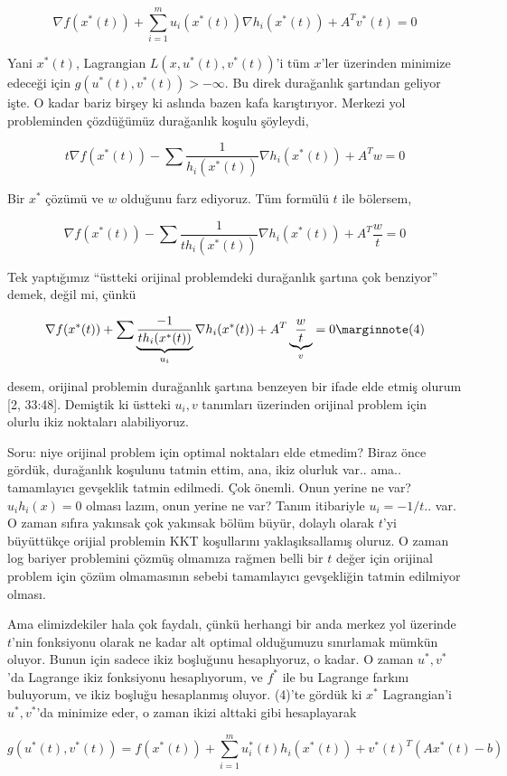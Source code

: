 \documentclass[12pt,fleqn]{article}\usepackage{../../common}
\begin{document}
$$
\nabla f(x^*(t)) + \sum _{i=1}^{m} u_i (x^*(t)) \nabla h_i(x^*(t)) + 
A^T v^*(t) = 0
$$


Yani $x^*(t)$, Lagrangian $L(x,u^*(t),v^*(t))$'i tüm $x$'ler üzerinden
minimize edeceği için $g(u^*(t),v^*(t)) > -\infty$. Bu direk durağanlık
şartından geliyor işte. O kadar bariz birşey ki aslında bazen kafa
karıştırıyor. Merkezi yol probleminden çözdüğümüz durağanlık koşulu
şöyleydi,

$$
t \nabla f(x^*(t)) - \sum \frac{1}{h_i(x^*(t))} \nabla h_i(x^*(t)) + A^T w= 0
$$

Bir $x^*$ çözümü ve $w$ olduğunu farz ediyoruz. Tüm formülü $t$ ile
bölersem,

$$
\nabla f(x^*(t)) - \sum \frac{1}{t h_i(x^*(t))} \nabla h_i(x^*(t)) + A^T \frac{w}{t}= 0
$$

Tek yaptığımız ``üstteki orijinal problemdeki durağanlık şartına çok
benziyor'' demek, değil mi, çünkü 

$$
\nabla f(x^*(t)) +
\sum \underbrace{\frac{-1}{t h_i(x^*(t))}}_{u_i} \nabla h_i(x^*(t)) + 
A^T \underbrace{\frac{w}{t}}_{v}= 0 
\mlabel{4}
$$

desem, orijinal problemin durağanlık şartına benzeyen bir ifade elde etmiş
olurum [2, 33:48]. Demiştik ki üstteki $u_i,v$ tanımları üzerinden orijinal
problem için olurlu ikiz noktaları alabiliyoruz. 

Soru: niye orijinal problem için optimal noktaları elde etmedim? Biraz önce
gördük, durağanlık koşulunu tatmin ettim, ana, ikiz olurluk
var.. ama.. tamamlayıcı gevşeklik tatmin edilmedi. Çok önemli. Onun yerine
ne var? $u_i h_i (x) = 0$ olması lazım, onun yerine ne var? Tanım
itibariyle $u_i = -1/t ..$ var. O zaman sıfıra yakınsak çok yakınsak bölüm
büyür, dolaylı olarak $t$'yi büyüttükçe orijial problemin KKT koşullarını
yaklaşıksallamış oluruz. O zaman log bariyer problemini çözmüş olmamıza
rağmen belli bir $t$ değer için orijinal problem için çözüm olmamasının
sebebi tamamlayıcı gevşekliğin tatmin edilmiyor olması.

Ama elimizdekiler hala çok faydalı, çünkü herhangi bir anda merkez yol
üzerinde $t$'nin fonksiyonu olarak ne kadar alt optimal olduğumuzu
sınırlamak mümkün oluyor. Bunun için sadece ikiz boşluğunu hesaplıyoruz, o
kadar. O zaman $u^*,v^*$'da Lagrange ikiz fonksiyonu hesaplıyorum, ve $f^*$
ile bu Lagrange farkını buluyorum, ve ikiz boşluğu hesaplanmış oluyor. 
(4)'te gördük ki $x^*$ Lagrangian'i $u^*,v^*$'da minimize eder, o zaman
ikizi alttaki gibi hesaplayarak 

$$
g(u^*(t),v^*(t)) = 
f(x^*(t)) + \sum_{i=1}^{m} u_i^*(t) h_i(x^*(t)) + v^*(t)^T (Ax^*(t) - b)
$$
\end{document}
